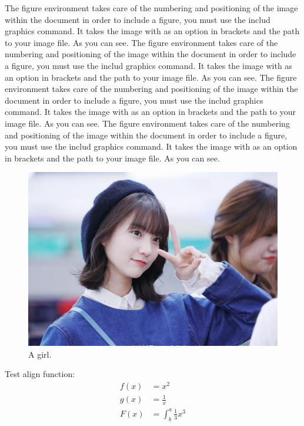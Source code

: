 \documentclass[18pt]{article}
\begin{document}
The figure environment takes care of the numbering and positioning of the image within the document in order to include a figure, you must use the includ graphics command. It takes the image with as an option in brackets and the path to your image file.  As you can see.
The figure environment takes care of the numbering and positioning of the image within the document in order to include a figure, you must use the includ graphics command. It takes the image with as an option in brackets and the path to your image file.  As you can see.
The figure environment takes care of the numbering and positioning of the image within the document in order to include a figure, you must use the includ graphics command. It takes the image with as an option in brackets and the path to your image file.  As you can see.
The figure environment takes care of the numbering and positioning of the image within the document in order to include a figure, you must use the includ graphics command. It takes the image with as an option in brackets and the path to your image file.  As you can see.
\begin{figure}
    \includegraphics[width=\linewidth]{./Img/A_Girl.jpg}
    \caption{A girl.}
    \label{fig:boat1}
\end{figure}

Test align function: 
\begin{align*}
f(x) &= x^2\\
g(x) &= \frac{1}{x}\\
F(x) &= \int^a_b \frac{1}{3}x^3
\end{align*}
\end{document}

